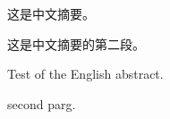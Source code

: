 
\begin{cabstract}
	这是中文摘要。
	\par
	这是中文摘要的第二段。
\end{cabstract}

\begin{eabstract}
	Test of the English abstract.
	\par
	second parg.
\end{eabstract}

